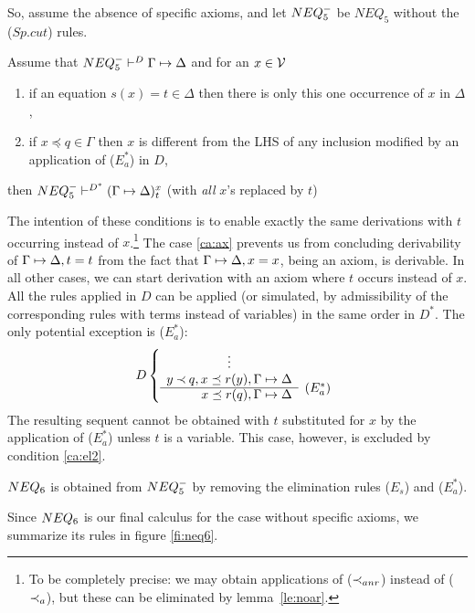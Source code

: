 So, assume the absence of specific axioms, and let $NEQ_5^-$ be $NEQ_5$
without the ($Sp.cut$) rules.
%
\begin{LEMMA}\label{le:ssp}
Assume that ${NEQ_5^-}\vdash^{{D}}\Gamma\mathrel{\mapsto}\Delta$ and for an $x\in{\cal V}$
\begin{enumerate}\MyLPar
\item\label{ca:ax} if an equation $s(x)=t \in \Delta$ then there is only this one
occurrence of $x$ in $\Delta$,
\item\label{ca:el2} if $x\preceq q \in\Gamma$ then $x$ is different from the LHS of any
inclusion modified by an application of ($E_a^*$) in $D$,
\end{enumerate}
\noindent
then ${NEQ_5^-}\vdash^{{D^*}}(\Gamma\mathrel{\mapsto}\Delta)_t^x$ (with {\em all} $x$'s replaced by $t$)
\end{LEMMA}
\begin{PROOF}
The intention of these conditions is to enable exactly the same derivations
with $t$ occurring instead of $x$.\footnote{To be completely precise: we may
obtain applications of ($\mathbin{\prec}_{anr}$) instead of ($\mathbin{\prec}_a$), but these can be
eliminated by lemma~\ref{le:noar}.}
The case \ref{ca:ax} prevents us from concluding derivability of $\Gamma\mathrel{\mapsto}\Delta, t=t$
from the fact that $\Gamma\mathrel{\mapsto}\Delta,x=x$, being an axiom, is derivable. 
In all other cases, we can
 start derivation with an axiom where $t$ occurs instead of $x$. All the
 rules applied in $D$ can be applied (or simulated, by admissibility of the
 corresponding rules with terms instead of variables) in the same order in
 $D^*$.
The only potential exception is ($E_a^*$):
\[ D \left \{ \begin{array}{rl}
 \multicolumn{1}{c}{\vdots} \\
 y\Incl q, x\preceq r(y),\GSD  \\ \cline{1-1}
 x\preceq r(q),\GSD & \rabove{(E_a^*)} \end{array} \right . \]
The resulting sequent cannot be obtained with $t$ substituted for $x$ by the
application of ($E_a^*$) unless $t$ is a variable. This case, however, is
excluded by condition \ref{ca:el2}.
\end{PROOF}

\begin{DEFINITION}\label{de:neq6}
 $NEQ_6$ is obtained from $NEQ_5^-$ by removing the elimination rules ($E_s$)
 and ($E_a^*$).
\end{DEFINITION}
\noindent
Since $NEQ_6$ is our final calculus for the case without specific axioms, we
summarize its rules in figure \ref{fi:neq6}. 

